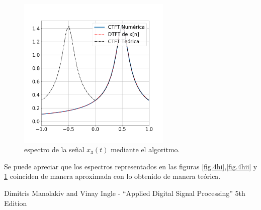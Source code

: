 \documentclass[11pt,a4paper]{article}
\begin{document}
    \begin{figure}[H]
    \centering
    \includegraphics[width=0.65\textwidth]{Img/punto_4_h_3.png}
    \caption{espectro de la señal $x_{3}(t)$ mediante el algoritmo.}
    \label{fig.4hiii}
    \end{figure}

    Se puede apreciar que los espectros representados en las figuras \ref{fig.4hi},\ref{fig.4hii} y \ref{fig.4hiii} coinciden de manera aproximada con lo obtenido de manera teórica. 
    




\begin{thebibliography}{0}
    Dimitris Manolakiv and Vinay Ingle - ``Applied Digital Signal Processing'' 5th Edition
\end{thebibliography}
\end{document}

